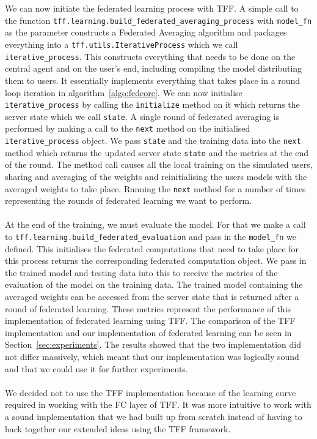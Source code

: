 \documentclass[12pt]{article}
\begin{document}
\\\\
We can now initiate the federated learning process with TFF. A simple call to the function \texttt{tff.learning.build\_federated\_averaging\_process} with \texttt{model\_fn} as the parameter constructs a Federated Averaging algorithm and packages everything into a \texttt{tff.utils.IterativeProcess} which we call \texttt{iterative\_process}. This constructs everything that needs to be done on the central agent and on the user's end, including compiling the model distributing them to users. It essentially implements everything that takes place in a round loop iteration in algorithm~\ref{algo:fedcore}. We can now initialise \texttt{iterative\_process} by calling the \texttt{initialize} method on it which returns the server state which we call \texttt{state}. A single round of federated averaging is performed by making a call to the \texttt{next} method on the initialised \texttt{iterative\_process} object. We pass \texttt{state} and the training data into the \texttt{next} method which returns the updated server state \texttt{state} and the metrics at the end of the round. The method call causes all the local training on the simulated users, sharing and averaging of the weights and reinitialising the users models with the averaged weights to take place. Running the \texttt{next} method for a number of times representing the rounds of federated learning we want to perform. 
\\\\
At the end of the training, we must evaluate the model. For that we make a call to \texttt{tff.learning.build\_federated\_evaluation} and pass in the \texttt{model\_fn} we defined. This initialises the federated computations that need to take place for this process returns the corresponding federated computation object. We pass in the trained model and testing data into this to receive the metrics of the evaluation of the model on the training data. The trained model containing the averaged weights can be accessed from the server state that is returned after a round of federated learning. These metrics represent the performance of this implementation of federated learning using TFF. The comparison of the TFF implementation and our implementation of federated learning can be seen in Section~\ref{sec:experiments}. The results showed that the two implementation did not differ massively, which meant that our implementation was logically sound and that we could use it for further experiments.
\\\\
We decided not to use the TFF implementation because of the learning curve required in working with the FC layer of TFF. It was more intuitive to work with a sound implementation that we had built up from scratch instead of having to hack together our extended ideas using the TFF framework. 
\clearpage
\end{document}
